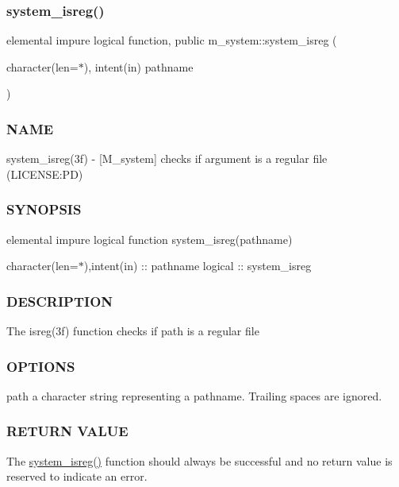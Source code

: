 \subsubsection{\texorpdfstring{system\+\_\+isreg()}{system\_isreg()}}
{\footnotesize\ttfamily elemental impure logical function, public m\+\_\+system\+::system\+\_\+isreg (\begin{DoxyParamCaption}\item[{character(len=$\ast$), intent(in)}]{pathname }\end{DoxyParamCaption})}



\subsubsection*{N\+A\+ME}

system\+\_\+isreg(3f) -\/ \mbox{[}M\+\_\+system\mbox{]} checks if argument is a regular file (L\+I\+C\+E\+N\+SE\+:PD) 

\subsubsection*{S\+Y\+N\+O\+P\+S\+IS}

elemental impure logical function system\+\_\+isreg(pathname)

character(len=$\ast$),intent(in) \+:\+: pathname logical \+:\+: system\+\_\+isreg

\subsubsection*{D\+E\+S\+C\+R\+I\+P\+T\+I\+ON}

The isreg(3f) function checks if path is a regular file

\subsubsection*{O\+P\+T\+I\+O\+NS}

path a character string representing a pathname. Trailing spaces are ignored.

\subsubsection*{R\+E\+T\+U\+RN V\+A\+L\+UE}

The \mbox{\hyperlink{namespacem__system_a8ea0d0430227af61b8083b4e7d6e597d}{system\+\_\+isreg()}} function should always be successful and no return value is reserved to indicate an error.

